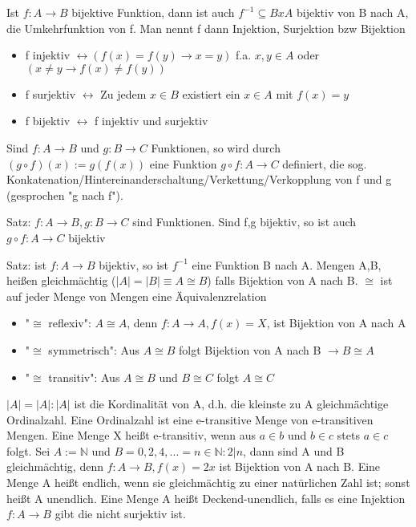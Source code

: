 \documentclass[10pt,landscape]{article}
\begin{document}
\begin{multicols}{3}
Ist $f:A\rightarrow B$ bijektive Funktion, dann ist auch $f^{-1}\subseteq BxA$ bijektiv von B nach A, die Umkehrfunktion von f.
Man nennt f dann Injektion, Surjektion bzw Bijektion
\begin{itemize}
    \item f injektiv $\leftrightarrow (f(x)=f(y)\rightarrow x=y)$ f.a. $x,y\in A$ oder $(x\not = y \rightarrow f(x)\not = f(y))$
    \item f surjektiv $\leftrightarrow$ Zu jedem $x\in B$ existiert ein $x\in A$ mit $f(x)=y$
    \item f bijektiv $\leftrightarrow$ f injektiv und surjektiv
\end{itemize}

Sind $f:A\rightarrow B$ und $g:B\rightarrow C$ Funktionen, so wird durch $(g \circ f)(x):=g(f(x))$ eine Funktion $g \circ f: A \rightarrow C$ definiert, die sog. Konkatenation/Hintereinanderschaltung/Verkettung/Verkopplung von f und g (gesprochen "g nach f").

Satz: $f:A\rightarrow B, g:B\rightarrow C$ sind Funktionen. Sind f,g bijektiv, so ist auch $g \circ f: A\rightarrow C$ bijektiv

Satz: ist $f:A\rightarrow B$ bijektiv, so ist $f^{-1}$ eine Funktion B nach A. Mengen A,B, heißen gleichmächtig ($|A|=|B| \equiv A\cong B$) falls Bijektion von A nach B. $\cong$ ist auf jeder Menge von Mengen eine Äquivalenzrelation
\begin{itemize}
    \item "$\cong$ reflexiv": $A\cong A$, denn $f:A\rightarrow A, f(x)=X$, ist Bijektion von A nach A
    \item "$\cong$ symmetrisch": Aus $A\cong B$ folgt Bijektion von A nach B $\rightarrow B\cong A$
    \item "$\cong$ transitiv": Aus $A\cong B$ und $B\cong C$ folgt $A\cong C$
\end{itemize}

$|A|=|A|:|A|$ ist die Kordinalität von A, d.h. die kleinste zu A gleichmächtige Ordinalzahl. Eine Ordinalzahl ist eine e-transitive Menge von e-transitiven Mengen. Eine Menge X heißt e-transitiv, wenn aus $a\in b$ und $b\in c$ stets $a\in c$ folgt.
Sei $A:=\mathbb{N}$ und $B={0,2,4,...}={n\in \mathbb{N}: 2|n}$, dann sind A und B gleichmächtig, denn $f:A\rightarrow B, f(x)=2x$ ist Bijektion von A nach B.
Eine Menge A heißt endlich, wenn sie gleichmächtig zu einer natürlichen Zahl ist; sonst heißt A unendlich.
Eine Menge A heißt Deckend-unendlich, falls es eine Injektion $f:A\rightarrow B$ gibt die nicht surjektiv ist.


\end{multicols}
\end{document}
